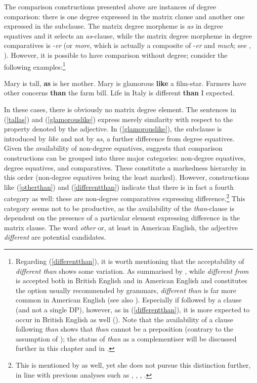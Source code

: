 The comparison constructions presented above are instances of degree comparison: there is one degree expressed in the matrix clause and another one expressed in the subclause. The matrix degree morpheme is \textit{as} in degree equatives and it selects an \textit{as}-clause, while the matrix degree morpheme in degree comparatives is -\textit{er} (or \textit{more}, which is actually a composite of -\textit{er} and \textit{much}; see \citealt{bresnan1973}, \citealt{bacskaiatkari2014diss, bacskaiatkari2018langsci}). However, it is possible to have comparison without degree; consider the following examples:\footnote{Regarding (\ref{differentthan}), it is worth mentioning that the acceptability of \textit{different than} shows some variation. As summarised by \citet[747]{hundt2001}, while \textit{different from} is accepted both in British English and in American English and constitutes the option usually recommended by grammars, \textit{different than} is far more common in American English (see also \citealt[213]{burchfield1996}). Especially if followed by a clause (and not a single DP), however, as in (\ref{differentthan}), it is more expected to occur in British English as well (\citealt[621]{fowlergowers1965}). Note that the availability of a clause following \textit{than} shows that \textit{than} cannot be a preposition (contrary to the assumption of \citealt[747--749]{hundt2001}); the status of \textit{than} as a complementiser will be discussed further in this chapter and in .}

\ea \label{nondegreecomparison}
\ea Mary is tall, \textbf{as} is her mother. \label{tallas}
\ex Mary is glamorous \textbf{like} a film-star. \label{glamorouslike}
\ex Farmers have other concerns \textbf{than} the farm bill. \label{otherthan}
\ex Life in Italy is different \textbf{than} I expected. \label{differentthan}
\z
\z

In these cases, there is obviously no matrix degree element. The sentences in (\ref{tallas}) and (\ref{glamorouslike}) express merely similarity with respect to the property denoted by the adjective. In (\ref{glamorouslike}), the subclause is introduced by \textit{like} and not by \textit{as}, a further difference from degree equatives. Given the availability of non-degree equatives, \citet[35]{jaeger2018} suggests that comparison constructions can be grouped into three major categories: non-degree equatives, degree equatives, and comparatives. These constitute a markedness hierarchy in this order (non-degree equatives being the least marked). However, constructions like (\ref{otherthan}) and (\ref{differentthan}) indicate that there is in fact a fourth category as well: these are non-degree comparatives expressing difference.\footnote{This is mentioned by \citet[35]{jaeger2018} as well, yet she does not pursue this distinction further, in line with previous analyses such as \citet{thurmair2001}, \citet{hahnemann1999}, \citet{kennedy1999}, \citet{zeilfelder2001habil}.} This category seems not to be productive, as the availability of the \textit{than}-clause is dependent on the presence of a particular element expressing difference in the matrix clause. The word \textit{other} or, at least in American English, the adjective \textit{different} are potential candidates.

